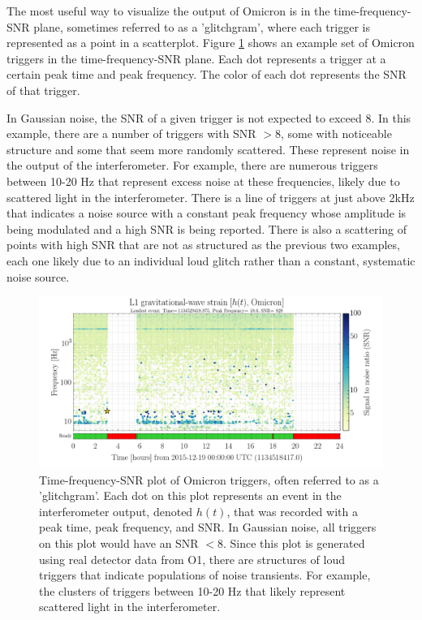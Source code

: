 The most useful way to visualize the output of Omicron is in the 
time-frequency-SNR plane, sometimes referred to as a 'glitchgram', 
where each trigger is represented as a point 
in a scatterplot. Figure \ref{fig:glitchgram} shows an example set of 
Omicron triggers in the time-frequency-SNR plane. Each dot represents 
a trigger at a certain peak time and peak frequency. The color of each 
dot represents the SNR of that trigger. 

In Gaussian noise, the SNR of a 
given trigger is not expected to exceed 8. In this example, there are a number 
of triggers with SNR $> 8$, some with noticeable structure and some that seem 
more randomly scattered. These represent noise in the output of the interferometer. 
For example, there are numerous triggers between 10-20 Hz that represent excess noise at 
these frequencies, likely due to scattered light in the 
interferometer. There is a line of triggers at just above 2kHz that indicates 
a noise source with a constant peak frequency whose amplitude is being modulated 
and a high SNR is being reported. There is also a scattering of points with high 
SNR that are not as structured as the previous two examples, each one likely due 
to an individual loud glitch rather than a constant, systematic noise source.

\begin{figure}[ht!]
\includegraphics[width=\textwidth]{figures/detchar/Omicron-Dec19}
\caption[Omicron time-frequency-SNR plot]{Time-frequency-SNR plot of Omicron triggers, %
         often referred to as a 'glitchgram'. Each dot on this plot represents an %
         event in the interferometer output, denoted $h(t)$, that was recorded %
         with a peak time, peak frequency, and SNR. %
         In Gaussian noise, all triggers on %
         this plot would have an SNR $< 8$. Since this plot is generated using real %
         detector data from O1, there are structures of loud triggers that indicate %
         populations of noise transients. For example, the clusters of triggers %
         between 10-20 Hz that likely represent scattered light in the interferometer. %
         }
\label{fig:glitchgram}
\end{figure}

